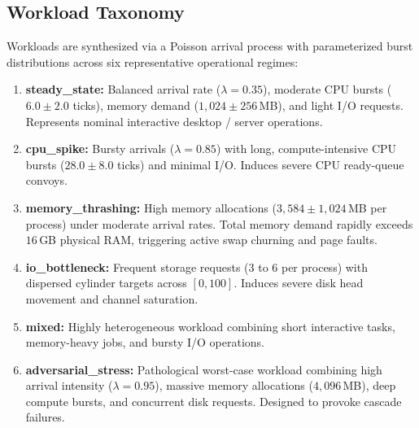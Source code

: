 \documentclass[conference]{IEEEtran}
\begin{document}
\subsection{Workload Taxonomy}
Workloads are synthesized via a Poisson arrival process with parameterized burst distributions across six representative operational regimes:
\begin{enumerate}
    \item \textbf{steady\_state:} Balanced arrival rate ($\lambda = 0.35$), moderate CPU bursts ($6.0 \pm 2.0$ ticks), memory demand ($1,024 \pm 256$\,MB), and light I/O requests. Represents nominal interactive desktop / server operations.
    \item \textbf{cpu\_spike:} Bursty arrivals ($\lambda = 0.85$) with long, compute-intensive CPU bursts ($28.0 \pm 8.0$ ticks) and minimal I/O. Induces severe CPU ready-queue convoys.
    \item \textbf{memory\_thrashing:} High memory allocations ($3,584 \pm 1,024$\,MB per process) under moderate arrival rates. Total memory demand rapidly exceeds $16$\,GB physical RAM, triggering active swap churning and page faults.
    \item \textbf{io\_bottleneck:} Frequent storage requests ($3$ to $6$ per process) with dispersed cylinder targets across $[0, 100]$. Induces severe disk head movement and channel saturation.
    \item \textbf{mixed:} Highly heterogeneous workload combining short interactive tasks, memory-heavy jobs, and bursty I/O operations.
    \item \textbf{adversarial\_stress:} Pathological worst-case workload combining high arrival intensity ($\lambda = 0.95$), massive memory allocations ($4,096$\,MB), deep compute bursts, and concurrent disk requests. Designed to provoke cascade failures.
\end{enumerate}
\end{document}
